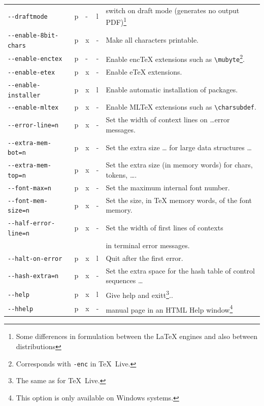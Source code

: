 \documentclass[a4paper]{article}%
\newcommand{\texlive}{\TeX~Live}
\begin{document}
{\begin{longtable}{lllll}
\texttt{-{}-draftmode}                & p&-&l  & switch on draft mode (generates no output PDF)\footnote%
{Some differences in formulation between the \LaTeX{} engines and also between distributions} \\
\texttt{-{}-enable-8bit-chars}        & p&x&- & Make all characters printable. \\
\texttt{-{}-enable-enctex}            & p&-&- & Enable encTeX extensions such as \texttt{\textbackslash{}mubyte}\footnote%
{Corresponds with \texttt{-enc} in \texlive. }. \\
\texttt{-{}-enable-etex}              & p&x&- & Enable eTeX extensions. \\
\texttt{-{}-enable-installer}        & p&x&l       & Enable automatic installation of packages. \\
\texttt{-{}-enable-mltex}             & p&x&- & Enable MLTeX extensions such as \texttt{\textbackslash{}charsubdef}. \\
\texttt{-{}-error-line=n}             & p&x&- & Set the width of context lines on \dots error messages. \\
\texttt{-{}-extra-mem-bot=n}          & p&x&- & Set the extra size \dots{} for large data structures \dots \\
\texttt{-{}-extra-mem-top=n}          & p&x&- & Set the extra size (in memory words) for chars, tokens, \dots. \\
\texttt{-{}-font-max=n}               & p&x&- & Set the maximum internal font number. \\
\texttt{-{}-font-mem-size=n}          & p&x&- & Set the size, in TeX memory words, of the font memory. \\
\texttt{-{}-half-error-line=n}        & p&x&- & Set the width of first lines of contexts \\
                                      &  & &        & in terminal error messages. \\
\texttt{-{}-halt-on-error}            & p&x&l       & Quit after the first error. \\
\texttt{-{}-hash-extra=n}             & p&x&- & Set the extra space for the hash table of control sequences \dots \\
\texttt{-{}-help}                     & p&x&l       & Give help and exitt\footnote%
{The same as for \texlive. }.. \\
\texttt{-{}-hhelp}                   & p&x&- & manual page in an HTML Help window\footnote%
{This option is only available on Windows systems.} \\

\end{longtable}}
\end{document}
